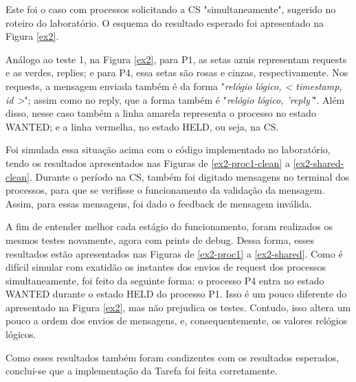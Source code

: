 \documentclass[conference]{IEEEtran}
\begin{document}
	Este foi o caso com processos solicitando a CS "simultaneamente", sugerido no roteiro do laboratório. O esquema do resultado esperado foi apresentado na Figura \ref{ex2}.
	
	Análogo ao teste 1, na Figura \ref{ex2}, para P1, as setas azuis representam requests e as verdes, replies; e para P4, essa setas são rosas e cinzas, respectivamente. Nos requests, a mensagem enviada também é da forma "\textit{relógio lógico, < timestamp, id >}"; assim como no reply, que a forma também é "\textit{relógio lógico, 'reply'}". Além disso, nesse caso também a linha amarela representa o processo no estado WANTED; e a linha vermelha, no estado HELD, ou seja, na CS.


	Foi simulada essa situação acima com o código implementado no laboratório, tendo os resultados apresentados nas Figuras de \ref{ex2-proc1-clean} a \ref{ex2-shared-clean}. Durante o período na CS, também foi digitado mensagens no terminal dos processos, para que se verifisse o funcionamento da validação da mensagem. Assim, para essas mensagens, foi dado o feedback de mensagem inválida.

	A fim de entender melhor cada estágio do funcionamento, foram realizados os mesmos testes novamente, agora com prints de debug. Dessa forma, esses resultados estão apresentados nas Figuras de \ref{ex2-proc1} a \ref{ex2-shared}. Como é difícil simular com exatidão os instantes dos envios de request dos processos simultaneamente, foi feito da seguinte forma: o processo P4 entra no estado WANTED durante o estado HELD do processo P1. Isso é um pouco diferente do apresentado na Figura \ref{ex2}, mas não prejudica os testes. Contudo, isso altera um pouco a ordem dos envios de mensagens, e, consequentemente, os valores relógios lógicos.


	
	Como esses resultados também foram condizentes com os resultados esperados, conclui-se que a implementação da Tarefa foi feita corretamente.
	



\end{document}

